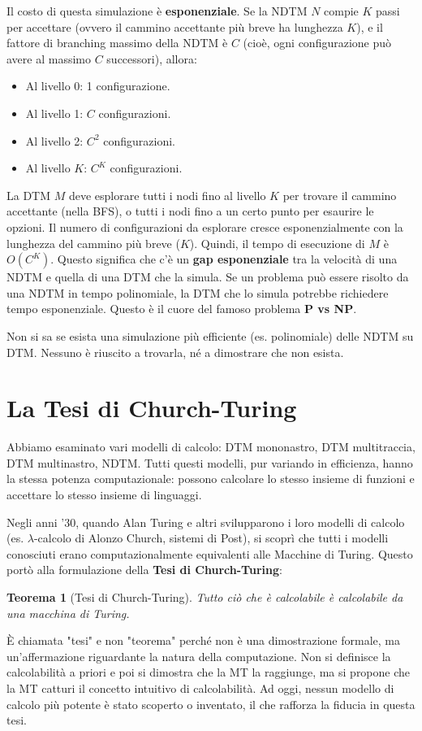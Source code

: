 \documentclass[a4paper]{article}
\newtheorem{theorem}{Teorema}
\begin{document}
Il costo di questa simulazione è \textbf{esponenziale}. Se la NDTM $N$ compie $K$ passi per accettare (ovvero il cammino accettante più breve ha lunghezza $K$), e il fattore di branching massimo della NDTM è $C$ (cioè, ogni configurazione può avere al massimo $C$ successori), allora:
\begin{itemize}
    \item Al livello 0: 1 configurazione.
    \item Al livello 1: $C$ configurazioni.
    \item Al livello 2: $C^2$ configurazioni.
    \item Al livello $K$: $C^K$ configurazioni.
\end{itemize}
La DTM $M$ deve esplorare tutti i nodi fino al livello $K$ per trovare il cammino accettante (nella BFS), o tutti i nodi fino a un certo punto per esaurire le opzioni. Il numero di configurazioni da esplorare cresce esponenzialmente con la lunghezza del cammino più breve ($K$). Quindi, il tempo di esecuzione di $M$ è $O(C^K)$.
Questo significa che c'è un \textbf{gap esponenziale} tra la velocità di una NDTM e quella di una DTM che la simula. Se un problema può essere risolto da una NDTM in tempo polinomiale, la DTM che lo simula potrebbe richiedere tempo esponenziale. Questo è il cuore del famoso problema \textbf{P vs NP}.

Non si sa se esista una simulazione più efficiente (es. polinomiale) delle NDTM su DTM. Nessuno è riuscito a trovarla, né a dimostrare che non esista.

\section{La Tesi di Church-Turing}

Abbiamo esaminato vari modelli di calcolo: DTM mononastro, DTM multitraccia, DTM multinastro, NDTM. Tutti questi modelli, pur variando in efficienza, hanno la stessa potenza computazionale: possono calcolare lo stesso insieme di funzioni e accettare lo stesso insieme di linguaggi.

Negli anni '30, quando Alan Turing e altri svilupparono i loro modelli di calcolo (es. $\lambda$-calcolo di Alonzo Church, sistemi di Post), si scoprì che tutti i modelli conosciuti erano computazionalmente equivalenti alle Macchine di Turing. Questo portò alla formulazione della \textbf{Tesi di Church-Turing}:

\begin{theorem}[Tesi di Church-Turing]
\emph{Tutto ciò che è calcolabile è calcolabile da una macchina di Turing.}
\end{theorem}
È chiamata "tesi" e non "teorema" perché non è una dimostrazione formale, ma un'affermazione riguardante la natura della computazione. Non si definisce la calcolabilità a priori e poi si dimostra che la MT la raggiunge, ma si propone che la MT catturi il concetto intuitivo di calcolabilità. Ad oggi, nessun modello di calcolo più potente è stato scoperto o inventato, il che rafforza la fiducia in questa tesi.
\end{document}
